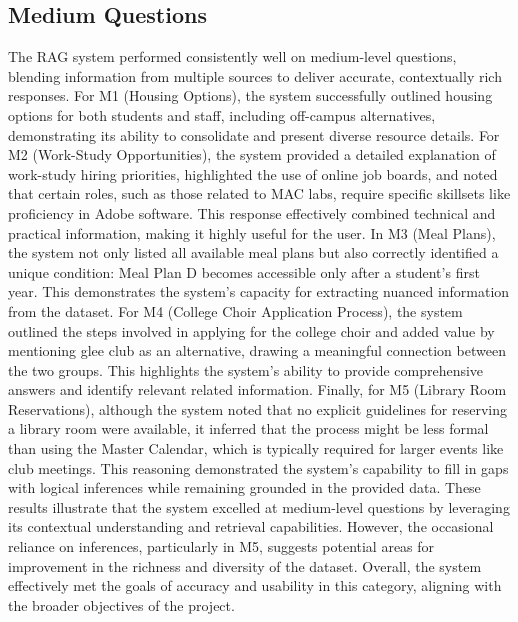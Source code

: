 \documentclass[10pt,twocolumn]{article}
\begin{document}
\subsection{Medium Questions}
The RAG system performed consistently well on medium-level questions, blending information from multiple sources to deliver accurate, contextually rich responses. For M1 (Housing Options), the system successfully outlined housing options for both students and staff, including off-campus alternatives, demonstrating its ability to consolidate and present diverse resource details. For M2 (Work-Study Opportunities), the system provided a detailed explanation of work-study hiring priorities, highlighted the use of online job boards, and noted that certain roles, such as those related to MAC labs, require specific skillsets like proficiency in Adobe software. This response effectively combined technical and practical information, making it highly useful for the user. In M3 (Meal Plans), the system not only listed all available meal plans but also correctly identified a unique condition: Meal Plan D becomes accessible only after a student’s first year. This demonstrates the system’s capacity for extracting nuanced information from the dataset. For M4 (College Choir Application Process), the system outlined the steps involved in applying for the college choir and added value by mentioning glee club as an alternative, drawing a meaningful connection between the two groups. This highlights the system’s ability to provide comprehensive answers and identify relevant related information. Finally, for M5 (Library Room Reservations), although the system noted that no explicit guidelines for reserving a library room were available, it inferred that the process might be less formal than using the Master Calendar, which is typically required for larger events like club meetings. This reasoning demonstrated the system’s capability to fill in gaps with logical inferences while remaining grounded in the provided data. These results illustrate that the system excelled at medium-level questions by leveraging its contextual understanding and retrieval capabilities. However, the occasional reliance on inferences, particularly in M5, suggests potential areas for improvement in the richness and diversity of the dataset. Overall, the system effectively met the goals of accuracy and usability in this category, aligning with the broader objectives of the project.
\end{document}
